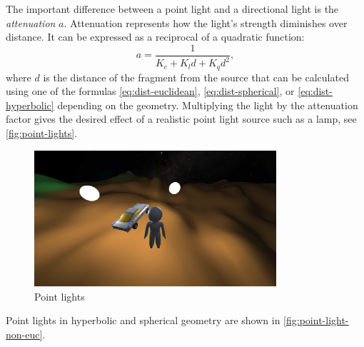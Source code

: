 The important difference between a point light and a directional light is the \textit{attenuation} $a$.
Attenuation represents how the light's strength diminishes over distance.
It can be expressed as a reciprocal of a quadratic function:
\begin{equation}
    a = \frac{1}{K_c + K_l d + K_q d^2},
\end{equation}
where $d$ is the distance of the fragment from the source that can be calculated using one of the formulas \ref{eq:dist-euclidean}, \ref{eq:dist-spherical}, or \ref{eq:dist-hyperbolic} depending on the geometry.
Multiplying the light by the attenuation factor gives the desired effect of a realistic point light source such as a lamp, see \autoref{fig:point-lights}.
\begin{figure}[h]
    \centering
    \includegraphics[width=0.8\textwidth]{chapters/theoretical_foundations/sections/lighting/resources/point-lights.png}
    \caption{Point lights}
    \label{fig:point-lights}
\end{figure}
Point lights in hyperbolic and spherical geometry are shown in \autoref{fig:point-light-non-euc}.
